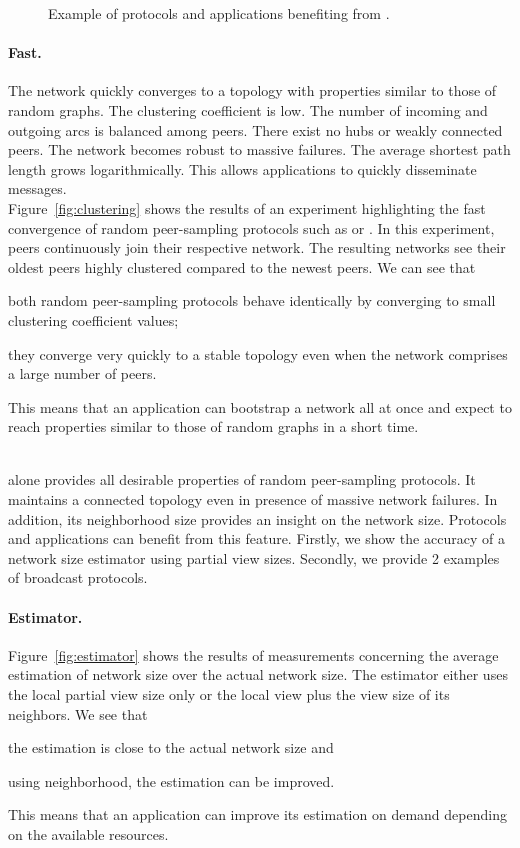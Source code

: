 \begin{figure}
\begin{center}
    \caption{Example of protocols and applications benefiting from \SPRAY.}
  \end{center}
\end{figure}






\paragraph{Fast.}
The network quickly converges to a topology with properties similar to
those of random graphs. The clustering coefficient is low. The number
of incoming and outgoing arcs is balanced among peers. There exist no
hubs or weakly connected peers. The network becomes robust to massive
failures. The average shortest path
length grows logarithmically. This allows applications to  quickly disseminate messages.\\
Figure~\ref{fig:clustering} shows the results of an experiment
highlighting the fast convergence of random peer-sampling protocols
such as \SPRAY or \CYCLON. In this experiment, peers continuously join
their respective network. The resulting networks see their oldest
peers highly clustered compared to the newest peers. We can see that
\begin{inparaenum}[(i)]
\item both random peer-sampling protocols behave identically by converging to
  small clustering coefficient values;
\item they converge very quickly to a stable topology even when the network
  comprises a large number of peers.
\end{inparaenum}
This means that an application can bootstrap a network all at once and
expect to reach properties similar to those of random graphs in a short
time.

\ \\ \indent \SPRAY alone provides all desirable properties of random peer-sampling
protocols. It maintains a connected topology even in presence of massive network
failures. In addition, its neighborhood size provides an insight on the network
size. Protocols and applications can benefit from this feature. Firstly, we show
the accuracy of a network size estimator using partial view sizes. Secondly, we
provide 2 examples of broadcast protocols.

\paragraph{Estimator.} Figure~\ref{fig:estimator} shows the results of
measurements concerning the average estimation of network size over the actual
network size. The estimator either uses the local partial view size only or the
local view plus the view size of its neighbors. We see that
\begin{inparaenum}[(i)]
\item the estimation is close to the actual network size and
\item using neighborhood, the estimation can be improved.
\end{inparaenum}
This means that an application can improve its estimation on demand depending on
the available resources.

